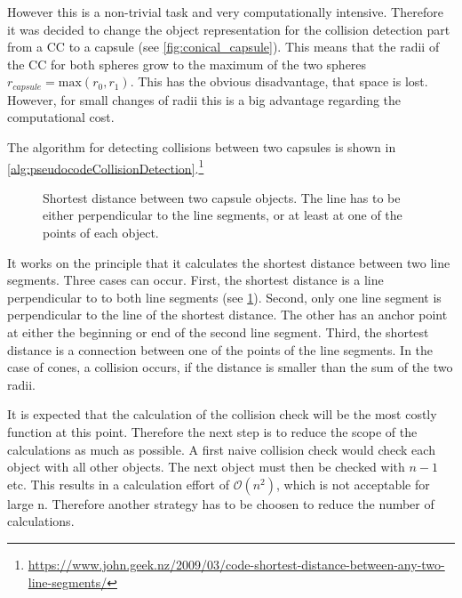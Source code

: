 %
However this is a non-trivial task and very computationally intensive.
Therefore it was decided to change the object representation for the collision detection part from a \ac{CC} to a capsule (see \cref{fig:conical_capsule}).
This means that the radii of the \ac{CC} for both spheres grow to the maximum of the two spheres $r_{\mathit{capsule}} = \mathrm{max}(r_0, r_1)$.
This has the obvious disadvantage, that space is lost. However, for small changes of radii this is a big advantage regarding the computational cost.
\par
% 
The algorithm for detecting collisions between two capsules is shown in \cref{alg:pseudocodeCollisionDetection}.\footnote{\href{https://www.john.geek.nz/2009/03/code-shortest-distance-between-any-two-line-segments/}{https://www.john.geek.nz/2009/03/code-shortest-distance-between-any-two-line-segments/}}
%
\begin{figure}[!t]
    \centering
    \def\tikzheight{0.5\textwidth}
	\caption[Shortest distance of capsule objects]{Shortest distance between two capsule objects. The line has to be either perpendicular to the line segments, or at least at one of the points of each object.}
	\label{fig:shortDist}
\end{figure}
%
It works on the principle that it calculates the shortest distance between two line segments.
Three cases can occur.
First, the shortest distance is a line perpendicular to to both line segments (see \cref{fig:shortDist}).
Second, only one line segment is perpendicular to the line of the shortest distance.
The other has an anchor point at either the beginning or end of the second line segment.
Third, the shortest distance is a connection between one of the points of the line segments.
In the case of cones, a collision occurs, if the distance is smaller than the sum of the two radii.
\par
% 
It is expected that the calculation of the collision check will be the most costly function at this point.
Therefore the next step is to reduce the scope of the calculations as much as possible.
A first naive collision check would check each object with all other objects.
The next object must then be checked with $n-1$ etc.
This results in a calculation effort of $\mathcal{O}(n^{2})$, which is not acceptable for large n.
Therefore another strategy has to be choosen to reduce the number of calculations.
%
